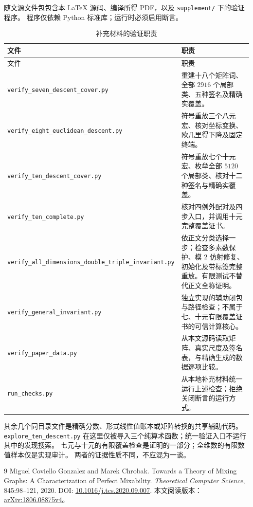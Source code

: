 \documentclass[UTF8,fontset=fandol,zihao=-4,a4paper]{ctexart}
\numberwithin{equation}{section}
\theoremstyle{definition}
\begin{document}
随文源文件包包含本 \LaTeX{} 源码、编译所得 PDF，以及 \texttt{supplement/} 下的验证程序。
程序仅依赖 Python 标准库；运行时必须启用断言。
\begin{longtable}{>{\raggedright\arraybackslash}p{}>{\raggedright\arraybackslash}p{}}
\caption{补充材料的验证职责}\label{tab:supplement}\\
\toprule 文件 & 职责\\\midrule\endfirsthead
\toprule 文件 & 职责\\\midrule\endhead
\nolinkurl{verify_seven_descent_cover.py} & 重建十八个矩阵词、全部 $2916$ 个局部类、五种签名及精确实覆盖。\\
\nolinkurl{verify_eight_euclidean_descent.py} & 符号重放三个八元宏、核对坐标变换、欧几里得下降及固定终端。\\
\nolinkurl{verify_ten_descent_cover.py} & 符号重放七个十元宏、枚举全部 $5120$ 个局部类、核对十二种签名与精确实覆盖。\\
\nolinkurl{verify_ten_complete.py} & 核对四例外配对及四步入口，并调用十元完整覆盖证书。\\
\nolinkurl{verify_all_dimensions_double_triple_invariant.py} & 依正文分类选择一步；检查多素数保护、模 $2$ 仿射修复、初始化及带标签完整重放。有限测试不替代正文全称证明。\\
\nolinkurl{verify_general_invariant.py} & 独立实现的辅助闭包与路径检查；不属于七、十元有限覆盖证书的可信计算核心。\\
\nolinkurl{verify_paper_data.py} & 从本文源码读取矩阵、真实尺度及签名表，与精确生成的数据逐项比较。\\
\nolinkurl{run_checks.py} & 从本地补充材料统一运行上述检查；拒绝关闭断言的运行方式。\\
\bottomrule
\end{longtable}

其余几个同目录文件是精确分数、形式线性值账本或矩阵转换的共享辅助代码。
\texttt{explore\_ten\_descent.py} 在这里仅被导入三个纯算术函数；统一验证入口不运行其中的发现搜索。
七元与十元的有限覆盖检查是证明的一部分；全维数的有限数值样本仅是实现审计。
两者的证据性质不同，不应混为一谈。

\begin{thebibliography}{9}
Miguel Coviello Gonzalez and Marek Chrobak.
\newblock Towards a Theory of Mixing Graphs: A Characterization of Perfect Mixability.
\newblock \emph{Theoretical Computer Science}, 845:98--121, 2020.
\newblock DOI: \href{https://doi.org/10.1016/j.tcs.2020.09.007}{10.1016/j.tcs.2020.09.007}.
\newblock 本文阅读版本：\href{https://arxiv.org/abs/1806.08875v4}{arXiv:1806.08875v4}。
\end{thebibliography}
\end{document}
